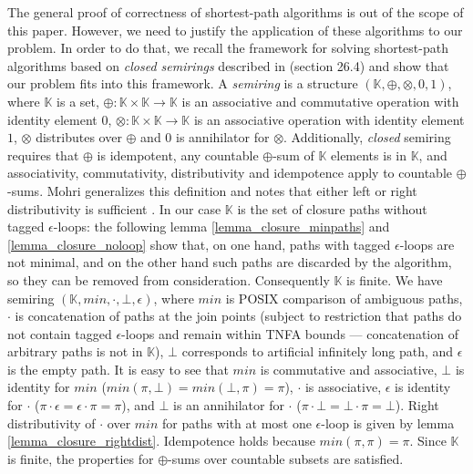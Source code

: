\documentclass[AMA,STIX1COL]{WileyNJD-v2}
\newcommand{\YK}{\mathbb{K}}
\begin{document}
The general proof of correctness of shortest-path algorithms is out of the scope of this paper.
However, we need to justify the application of these algorithms to our problem.
%
In order to do that, we recall the framework for solving shortest-path algorithms based on \emph{closed semirings}
described in \cite{CLR} (section 26.4)
and show that our problem fits into this framework.
%
A \emph{semiring} is a structure $(\YK, \oplus, \otimes, 0, 1)$, where
$\YK$ is a set,
$\oplus \!\!:\!\! \YK \times \YK \rightarrow \YK$ is an associative and commutative operation with identity element $0$,
$\otimes \!\!:\!\! \YK \times \YK \rightarrow \YK$ is an associative operation with identity element $1$,
$\otimes$ distributes over $\oplus$
and $0$ is annihilator for $\otimes$.
%
Additionally, \emph{closed} semiring requires that
$\oplus$ is idempotent,
any countable $\oplus$-sum of $\YK$ elements is in $\YK$,
and associativity, commutativity, distributivity and idempotence apply to countable $\oplus$-sums.
Mohri generalizes this definition and notes that either left or right distributivity is sufficient \cite{Moh02}.
%
In our case $\YK$ is the set of closure paths without tagged $\epsilon$-loops:
the following lemma \ref{lemma_closure_minpaths} and \ref{lemma_closure_noloop}
show that, on one hand, paths with tagged $\epsilon$-loops are not minimal,
and on the other hand such paths are discarded by the algorithm,
so they can be removed from consideration.
%
Consequently $\YK$ is finite.
We have semiring $(\YK, min, \cdot, \bot, \epsilon)$, where
$min$ is POSIX comparison of ambiguous paths,
$\cdot$ is concatenation of paths at the join points
(subject to restriction that paths do not contain tagged $\epsilon$-loops
and remain within TNFA bounds --- concatenation of arbitrary paths is not in $\YK$),
$\bot$ corresponds to artificial infinitely long path,
and $\epsilon$ is the empty path.
%
It is easy to see that
$min$ is commutative and associative,
$\bot$ is identity for $min$ ($min(\pi, \bot) = min(\bot, \pi) = \pi$),
$\cdot$ is associative,
$\epsilon$ is identity for $\cdot$ ($\pi \cdot \epsilon = \epsilon \cdot \pi = \pi$),
and $\bot$ is an annihilator for $\cdot$ ($\pi \cdot \bot = \bot \cdot \pi = \bot$).
Right distributivity of $\cdot$ over $min$ for paths with at most one $\epsilon$-loop is given by lemma \ref{lemma_closure_rightdist}.
%
Idempotence holds because $min(\pi, \pi) = \pi$.
%
Since $\YK$ is finite, the properties for $\oplus$-sums over countable subsets are satisfied.
\end{document}
